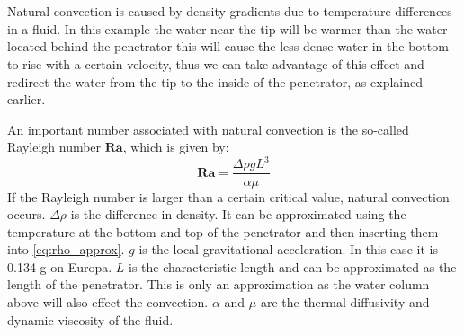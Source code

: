 \\
\\
Natural convection is caused by density gradients due to temperature differences in a fluid. In this example the water near the tip will be warmer than the water located behind the penetrator this will cause the less dense water in the bottom to rise with a certain velocity, thus we can take advantage of this effect and redirect the water from the tip to the inside of the penetrator, as explained earlier\cite{website:naturalConvectionPdf}.

An important number associated with natural convection is the so-called Rayleigh number $\mathbf{Ra}$, which is given by\cite{website:naturalConvectionWiki}:
\begin{equation}
	\mathbf{Ra} = \frac{\Delta\rho g L^3}{\alpha \mu}
\end{equation}
If the Rayleigh number is larger than a certain critical value, natural convection occurs. $\Delta\rho$ is the difference in density. It can be approximated using the temperature at the bottom and top of the penetrator and then inserting them into \eqref{eq:rho_approx}. $g$ is the local gravitational acceleration. In this case it is 0.134 g on Europa\cite{website:europaGravity}. $L$ is the characteristic length and can be approximated as the length of the penetrator. This is only an approximation as the water column above will also effect the convection. $\alpha$ and $\mu$ are the thermal diffusivity and dynamic viscosity of the fluid. %


